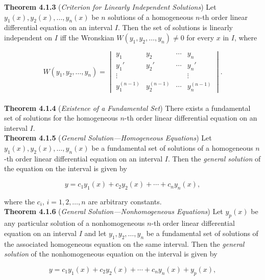 \documentclass[12pt]{article}
\begin{document}
\noindent\textbf{Theorem 4.1.3} (\emph{Criterion for Linearly Independent Solutions}) Let \(y_1(x), y_2(x), \ldots, y_n(x)\) be \(n\) solutions of a homogeneous \(n\)-th order linear differential equation on an interval \(I\). Then the set of solutions is linearly independent on \(I\) iff the Wronskian \(W(y_1, y_2, \ldots, y_n) \neq 0\) for every \(x\) in \(I\), where

\begin{equation}
    W(y_1, y_2, \ldots, y_n) = \begin{vmatrix}
        y_1 & y_2 & \cdots & y_n\\
        y_1' & y_2' & \cdots & y_n'\\
        \vdots & & & \vdots\\
        y_1^{(n-1)} & y_2^{(n-1)} & \cdots & y_n^{(n-1)}
    \end{vmatrix}.
\end{equation}\\

\noindent\textbf{Theorem 4.1.4} (\emph{Existence of a Fundamental Set}) There exists a fundamental set of solutions for the homogeneous \(n\)-th order linear differential equation on an interval \(I\).\\

\noindent\textbf{Theorem 4.1.5} (\emph{General Solution—Homogeneous Equations}) Let \(y_1(x), y_2(x), \ldots, y_n(x)\) be a fundamental set of solutions of a homogeneous \(n\)-th order linear differential equation on an interval \(I\). Then the \emph{general solution} of the equation on the interval is given by

\begin{equation}
    y = c_1y_1(x) + c_2y_2(x) + \cdots + c_ny_n(x),
\end{equation}

\noindent where the \(c_i\), \(i = 1, 2, \ldots, n\) are arbitrary constants.\\

\noindent\textbf{Theorem 4.1.6} (\emph{General Solution—Nonhomogeneous Equations}) Let \(y_p(x)\) be any particular solution of a nonhomogeneous \(n\)-th order linear differential equation on an interval \(I\) and let \(y_1, y_2, \ldots, y_n\) be a fundamental set of solutions of the associated homogeneous equation on the same interval. Then the \emph{general solution} of the nonhomogeneous equation on the interval is given by

\begin{equation}
    y = c_1y_1(x) + c_2y_2(x) + \cdots + c_ny_n(x) + y_p(x),
\end{equation}
\end{document}
